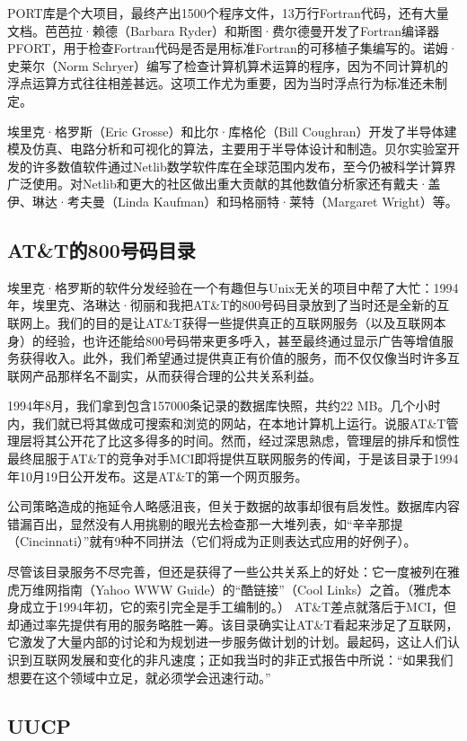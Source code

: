\documentclass[a4paper,12pt,UTF8,twoside]{ctexbook}
\begin{document}
PORT库是个大项目，最终产出1500个程序文件，13万行Fortran代码，还有大量文档。芭芭拉·赖德（Barbara Ryder）和斯图·费尔德曼开发了Fortran编译器PFORT，用于检查Fortran代码是否是用标准Fortran的可移植子集编写的。诺姆·史莱尔（Norm Schryer）编写了检查计算机算术运算的程序，因为不同计算机的浮点运算方式往往相差甚远。这项工作尤为重要，因为当时浮点行为标准还未制定。

埃里克·格罗斯（Eric Grosse）和比尔·库格伦（Bill Coughran）开发了半导体建模及仿真、电路分析和可视化的算法，主要用于半导体设计和制造。贝尔实验室开发的许多数值软件通过Netlib数学软件库在全球范围内发布，至今仍被科学计算界广泛使用。对Netlib和更大的社区做出重大贡献的其他数值分析家还有戴夫·盖伊、琳达·考夫曼（Linda Kaufman）和玛格丽特·莱特（Margaret Wright）等。

\subsection{AT\&T的800号码目录}

埃里克·格罗斯的软件分发经验在一个有趣但与Unix无关的项目中帮了大忙：1994年，埃里克、洛琳达·彻丽和我把AT\&T的800号码目录放到了当时还是全新的互联网上。我们的目的是让AT\&T获得一些提供真正的互联网服务（以及互联网本身）的经验，也许还能给800号码带来更多呼入，甚至最终通过显示广告等增值服务获得收入。此外，我们希望通过提供真正有价值的服务，而不仅仅像当时许多互联网产品那样名不副实，从而获得合理的公共关系利益。

1994年8月，我们拿到包含157000条记录的数据库快照，共约22 MB。几个小时内，我们就已将其做成可搜索和浏览的网站，在本地计算机上运行。说服AT\&T管理层将其公开花了比这多得多的时间。然而，经过深思熟虑，管理层的排斥和惯性最终屈服于AT\&T的竞争对手MCI即将提供互联网服务的传闻，于是该目录于1994年10月19日公开发布。这是AT\&T的第一个网页服务。

公司策略造成的拖延令人略感沮丧，但关于数据的故事却很有启发性。数据库内容错漏百出，显然没有人用挑剔的眼光去检查那一大堆列表，如“辛辛那提（Cincinnati）”就有9种不同拼法（它们将成为正则表达式应用的好例子）。

尽管该目录服务不尽完善，但还是获得了一些公共关系上的好处：它一度被列在雅虎万维网指南（Yahoo WWW Guide）的“酷链接”（Cool Links）之首。（雅虎本身成立于1994年初，它的索引完全是手工编制的。） AT\&T差点就落后于MCI，但却通过率先提供有用的服务略胜一筹。该目录确实让AT\&T看起来涉足了互联网，它激发了大量内部的讨论和为规划进一步服务做计划的计划。最起码，这让人们认识到互联网发展和变化的非凡速度；正如我当时的非正式报告中所说：“如果我们想要在这个领域中立足，就必须学会迅速行动。”

\subsection{UUCP}
\end{document}
